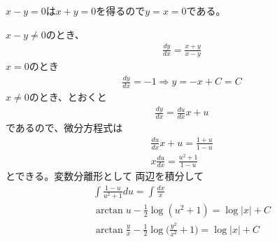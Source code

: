 \begin{ans*}
  $x-y = 0$は$x+y=0$を得るので$y = x = 0$である。

  $x-y\neq 0$のとき、
  \begin{gather}
    \frac{dy}{dx} = \frac{x+y}{x-y}
  \end{gather}
  $x=0$のとき
    \begin{gather}
      \frac{dy}{dx} = -1\Rightarrow y = -x + C = C
    \end{gather}
  $x\neq 0$のとき、とおくと
  \begin{gather}
    \frac{dy}{dx} = \frac{du}{dx}x + u
  \end{gather}
  であるので、微分方程式は
  \begin{gather}
    \frac{du}{dx}x + u = \frac{1 + u}{1 - u} \\
    x\frac{du}{dx} = \frac{u^2 + 1}{1-u}
  \end{gather}
  とできる。変数分離形として
  両辺を積分して
  \begin{gather}
    \int\frac{1-u}{u^2+1}du = \int\frac{dx}{x} \\
    \arctan u - \frac{1}{2}\log(u^2+1) = \log |x| + C \\
    \arctan \frac{y}{x} - \frac{1}{2}\log\biggl(\frac{y^2}{x^2}+1\biggr) = \log |x| + C
  \end{gather}
\end{ans*}

\newpage
